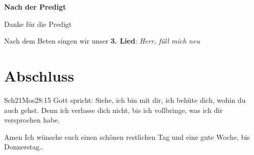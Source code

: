 \documentclass[12pt,a4paper]{scrarticle}
\begin{document}
\textbf{Nach der Predigt}

Danke für die Predigt

Nach dem Beten singen wir unser \textbf{3. Lied}: \textit{Herr, füll mich neu}\\

\section{Abschluss}

\begin{bibeltext}{Sch2}{1Mos}{28:15}
Gott spricht: Siehe, ich bin mit dir,
ich behüte dich, wohin du auch gehst.
Denn ich verlasse dich nicht,
bis ich vollbringe, was ich dir versprochen habe.
\end{bibeltext}
Amen
Ich wünsche euch einen schönen restlichen Tag und eine gute Woche, bis Donnerstag..
\end{document}

